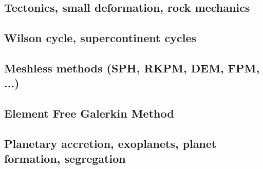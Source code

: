 \subsection*{Tectonics, small deformation, rock mechanics}

\noindent
\cite{ilma93}
\cite{hept96}
\cite{esfm08}
\cite{lega12}

\subsection*{Wilson cycle, supercontinent cycles}

\noindent
\cite{trry95}
\cite{zhzl07}
\cite{zhzm09}
\cite{buto14}
\cite{begb19}\cite{wihb19}

\subsection*{Meshless methods (SPH, RKPM, DEM, FPM, ...)}
 
 


\noindent
\cite{lucy77}
\cite{beko96}
\cite{mofz97}
\cite{begl00}
\cite{lilr02}
\cite{lill03}
\cite{wali04}
\cite{febh05}\cite{lixl05}
\cite{dacl10}
\cite{prcl11}\cite{kukg11}
\cite{koau13}\cite{viau13}
\cite{dazs14}
\cite{nifs15}
\cite{krrk18}

\subsection*{Element Free Galerkin Method}
 

\noindent
\cite{begl94b}
\cite{belg95a}
\cite{belg95b}
\cite{bekf96}\cite{como96}
\cite{bekk97}
\cite{pobe98}

\subsection*{Planetary accretion, exoplanets, planet formation, segregation}
 

